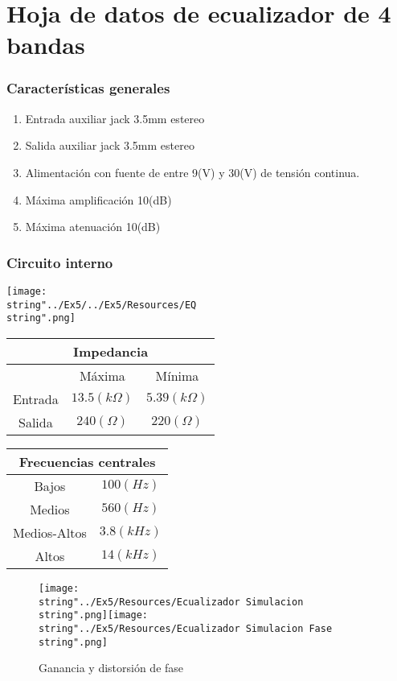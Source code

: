 \part*{Hoja de datos de ecualizador de 4 bandas}

\section{Características generales}
\begin{enumerate}
\item Entrada auxiliar jack 3.5mm estereo
\item Salida auxiliar jack 3.5mm estereo
\item Alimentación con fuente de entre 9(V) y 30(V) de tensión continua.
\item Máxima amplificación 10(dB)
\item Máxima atenuación 10(dB)
\end{enumerate}

\section{Circuito interno}
\begin{center}
\texttt{[image: \\string"../Ex5/../Ex5/Resources/EQ\\string".png]}
\par\end{center}

\begin{center}
\begin{tabular}{|c|c|c|}
\hline 
\multicolumn{3}{|c|}{Impedancia}\tabularnewline
\hline 
\hline 
 & Máxima & Mínima\tabularnewline
\hline 
Entrada & $13.5(k\Omega)$ & $5.39(k\Omega)$\tabularnewline
\hline 
Salida & $240(\Omega)$ & $220(\Omega)$\tabularnewline
\hline 
\end{tabular}
\par\end{center}

\begin{center}
\begin{tabular}{|c|c|}
\hline 
\multicolumn{2}{|c|}{Frecuencias centrales}\tabularnewline
\hline 
\hline 
Bajos & $100(Hz)$\tabularnewline
\hline 
Medios & $560(Hz)$\tabularnewline
\hline 
Medios-Altos & $3.8(kHz)$\tabularnewline
\hline 
Altos & $14(kHz)$\tabularnewline
\hline 
\end{tabular}
\par\end{center}

\begin{figure}[H]
\begin{centering}
\texttt{[image: \\string"../Ex5/Resources/Ecualizador Simulacion\\string".png]}\texttt{[image: \\string"../Ex5/Resources/Ecualizador Simulacion Fase\\string".png]}
\par\end{centering}
\caption{Ganancia y distorsión de fase}

\end{figure}

